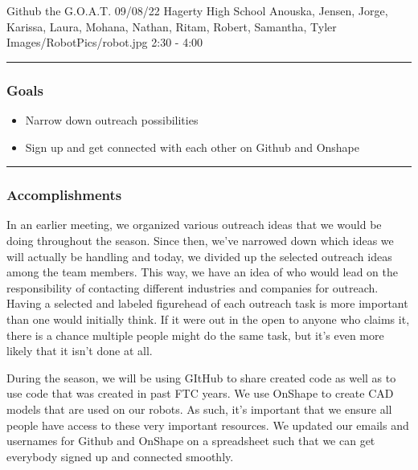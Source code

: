 \insertmeeting 
	{Github the G.O.A.T.} 
	{09/08/22}
	{Hagerty High School}
	{Anouska, Jensen, Jorge, Karissa, Laura, Mohana, Nathan, Ritam, Robert, Samantha, Tyler}
	{Images/RobotPics/robot.jpg}
	{2:30 - 4:00}
	
\noindent\hfil\rule{\textwidth}{.4pt}\hfil
\subsubsection*{Goals}
\begin{itemize}
    \item Narrow down outreach possibilities
    \item Sign up and get connected with each other on Github and Onshape
\end{itemize} 

\noindent\hfil\rule{\textwidth}{.4pt}\hfil

\subsubsection*{Accomplishments}
In an earlier meeting, we organized various outreach ideas that we would be doing throughout the season. Since then, we've narrowed down which ideas we will actually be handling and today, we divided up the selected outreach ideas among the team members. This way, we have an idea of who would lead on the responsibility of contacting different industries and companies for outreach. Having a selected and labeled figurehead of each outreach task is more important than one would initially think. If it were out in the open to anyone who claims it, there is a chance multiple people might do the same task, but it's even more likely that it isn't done at all.

During the season, we will be using GItHub to share created code as well as to use code that was created in past FTC years. We use OnShape to create CAD models that are used on our robots. As such, it's important that we ensure all people have access to these very important resources. We updated our emails and usernames for Github and OnShape on a spreadsheet such that we can get everybody signed up and connected smoothly.




